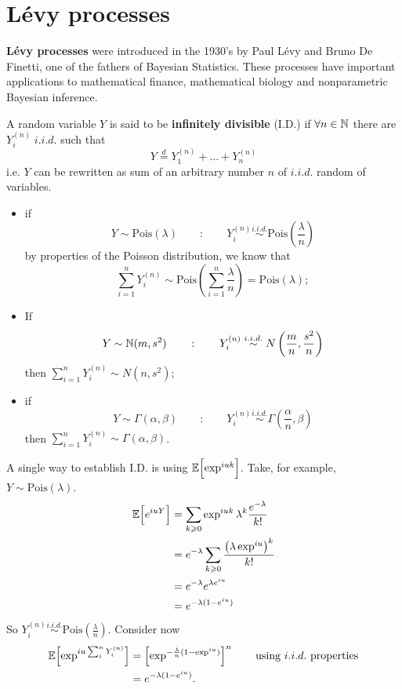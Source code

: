 \documentclass{article}
\begin{document}
	\section{L\'evy processes}
	\textbf{L\'evy processes} were introduced in the 1930's by Paul L\'evy and Bruno De Finetti, one of the fathers of Bayesian Statistics. These processes have important applications to mathematical finance, mathematical biology and nonparametric Bayesian inference.
	\begin{definition}
			A random variable $Y$ is said to be \textbf{infinitely divisible} (I.D.) if $\forall n \in \mathbb{N}$ there are $Y_i^{(n)}\; i.i.d.$ such that
		\[
		Y\stackrel{d}{=}Y_1^{(n)}+\ldots+Y_n^{(n)}
		\]
		i.e. $Y$ can be rewritten as sum of an arbitrary number $n$ of $i.i.d.$ random of variables.
	\end{definition}
	\begin{example}
		\begin{itemize}
			\item if \[
			Y\sim\text{Pois}(\lambda)\qquad:\qquad Y_i^{(n)}\stackrel{i.i.d.}{\sim}\text{Pois}\left(\frac{\lambda}{n}\right)
			\]
			by properties of the Poisson distribution, we know that
			\[\sum_{i=1}^{n}Y_i^{(n)}\sim \text{Pois}\left(\sum_{i=1}^{n}\frac{\lambda}{n}\right)=\text{Pois}(\lambda);\]
			\item If \[
			Y\sim\mathbb{N}(m,s^2)\qquad:\qquad Y_i^{(n)}\stackrel{i.i.d.}{\sim}N\left(\frac{m}{n},\frac{s^2}{n}\right)
			\]
			then $\sum_{i=1}^{n}Y_i^{(n)}\sim N(n,s^2)$;
			\item if \[
			Y\sim\Gamma(\alpha,\beta)\qquad:\qquad Y_i^{(n)}\stackrel{i.i.d.}{\sim}\Gamma\left(\frac{\alpha}{n},\beta\right)
			\]
			then $\sum_{i=1}^{n}Y_i^{(n)}\sim \Gamma(\alpha,\beta)$.
		\end{itemize}
	\end{example}
	A single way to establish I.D. is using $\mathbb{E}\Bigl[{\exp^{iuk}}\Bigr]$. Take, for example, $Y\sim\text{Pois}(\lambda)$.
	\begin{align*}
		\mathbb{E}\Bigl[{e^{iuY}}\Bigr]&=\sum_{k\geqslant0}\exp^{iuk}\lambda^k\frac{e^{-\lambda}}{k!}\\
		&=e^{-\lambda}\sum_{k\geqslant0}\frac{\left(\lambda\exp^{iu}\right)^k}{k!}\\
		&=e^{-\lambda}e^{\lambda e^{iu}}\\
		&=e^{-\lambda(1-e^{iu})}
	\end{align*}
	So $Y_i^{(n)}\stackrel{i.i.d.}{\sim}\text{Pois}(\frac{\lambda}{n})$. Consider now
	\begin{align*}
		\mathbb{E}\Bigl[{\exp^{iu\sum_{i}^{n}Y_i^{(n)}}}\Bigr]&=\left[\exp^{-\frac{\lambda}{n}(1-\exp^{iu})}\right]^n\qquad \text{using }i.i.d.\text{ properties}\\
		&=e^{-\lambda(1-e^{iu})}.
	\end{align*}
\end{document}
